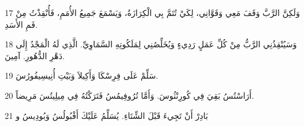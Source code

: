 \par 17 وَلَكِنَّ الرَّبَّ وَقَفَ مَعِي وَقَوَّانِي، لِكَيْ تُتَمَّ بِي الْكِرَازَةُ، وَيَسْمَعَ جَمِيعُ الأُمَمِ، فَأُنْقِذْتُ مِنْ فَمِ الأَسَدِ.
\par 18 وَسَيُنْقِذُنِي الرَّبُّ مِنْ كُلِّ عَمَلٍ رَدِيءٍ وَيُخَلِّصُنِي لِمَلَكُوتِهِ السَّمَاوِيِّ. الَّذِي لَهُ الْمَجْدُ إِلَى دَهْرِ الدُّهُورِ. آمِينَ.
\par 19 سَلِّمْ عَلَى فِرِسْكَا وَأَكِيلاَ وَبَيْتِ أُنِيسِيفُورُسَ.
\par 20 أَرَاسْتُسُ بَقِيَ فِي كُورِنْثُوسَ. وَأَمَّا تُرُوفِيمُسُ فَتَرَكْتُهُ فِي مِيلِيتُسَ مَرِيضاً.
\par 21 بَادِرْ أَنْ تَجِيءَ قَبْلَ الشِّتَاءِ. يُسَلِّمُ عَلَيْكَ أَفْبُولُسُ وَبُودِيسُ و

